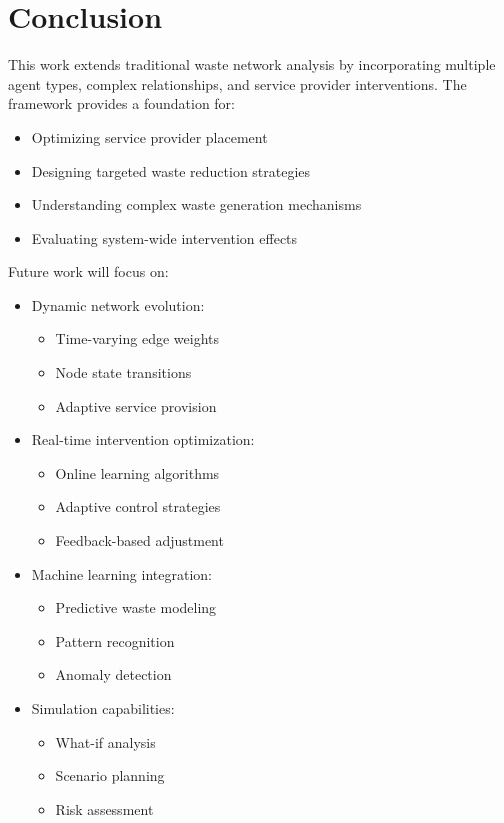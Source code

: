 \documentclass[12pt]{article}
\theoremstyle{definition}
\begin{document}
\section{Conclusion}
This work extends traditional waste network analysis by incorporating multiple agent types, complex relationships, and service provider interventions. The framework provides a foundation for:
\begin{itemize}
    \item Optimizing service provider placement
    \item Designing targeted waste reduction strategies
    \item Understanding complex waste generation mechanisms
    \item Evaluating system-wide intervention effects
\end{itemize}

Future work will focus on:
\begin{itemize}
    \item Dynamic network evolution:
        \begin{itemize}
            \item Time-varying edge weights
            \item Node state transitions
            \item Adaptive service provision
        \end{itemize}
    \item Real-time intervention optimization:
        \begin{itemize}
            \item Online learning algorithms
            \item Adaptive control strategies
            \item Feedback-based adjustment
        \end{itemize}
    \item Machine learning integration:
        \begin{itemize}
            \item Predictive waste modeling
            \item Pattern recognition
            \item Anomaly detection
        \end{itemize}
    \item Simulation capabilities:
        \begin{itemize}
            \item What-if analysis
            \item Scenario planning
            \item Risk assessment
        \end{itemize}
\end{itemize}



\end{document}
